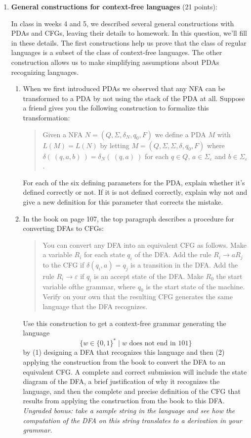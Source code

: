 \begin{enumerate}[wide, labelwidth=!, labelindent=0pt]
\item \textbf{General constructions for context-free languages} (21 points):

In class in weeks 4 and 5, we described several general constructions 
with PDAs and CFGs, leaving their details to
homework. In this question, we'll fill in these details. The first constructions
help us prove that the class of regular languages is a subset of the
class of context-free languages. The other construction allows us 
to make simplifying assumptions about PDAs recognizing languages.

\begin{enumerate}

\item\gradeCorrectFirst When we first introduced PDAs we observed 
that any NFA can be transformed to a PDA by not using the stack 
of the PDA at all. Suppose a friend gives you the following construction
to formalize this transformation:

\begin{quote}
Given a NFA $N = (Q, \Sigma, \delta_N, q_0, F)$ we define a PDA $M$
with $L(M) = L(N)$ by letting $M = ( Q, \Sigma, \Sigma, \delta, q_0, F)$ where 
$\delta(~(q,a,b)~) = \delta_N(~(q,a)~)$ for each $q \in Q$, 
$a \in \Sigma_{\varepsilon}$ and $b \in \Sigma_{\varepsilon}$.
\end{quote}

For each of the six defining parameters for the PDA, explain whether 
it's defined correctly or not. If it is not defined correctly, 
explain why not and give a new definition for this parameter that 
corrects the mistake.

\item\gradeCorrect In the book on page 107, the top paragraph describes a procedure for converting DFAs to CFGs:
\begin{quote}
   You can convert any DFA into an equivalent CFG as follows. 
   Make a variable $R_i$ for each state $q_i$ of the DFA. Add the rule $R_i \to aR_j$ to the
   CFG if $\delta(q_i,a) =q_j$ is a transition in the DFA. Add the rule
   $R_i\to \varepsilon$ if $q_i$ is an accept state of the DFA. Make $R_0$ the start variable ofthe grammar, 
   where $q_0$ is the start state of the machine. Verify on your own that the resulting CFG 
   generates the same language that the DFA recognizes.
\end{quote}

Use this construction to get a context-free grammar generating the language 
\[
    \{ w \in \{0,1\}^* \mid w \text{ does not end in  $101$}\}
\]
by (1) designing a DFA that recognizes this language and then (2) applying the construction from the book to convert the 
DFA to an equivalent CFG. A complete and correct submission will include the state diagram of the DFA, a brief justification of why 
it recognizes the language, and then the complete and precise definition of the CFG that results from applying the construction 
from the book to this DFA. {\it Ungraded bonus: take a sample string in the language and see how the computation of 
the DFA on this string translates to a derivation in your grammar.}


\end{enumerate}
\end{enumerate}
